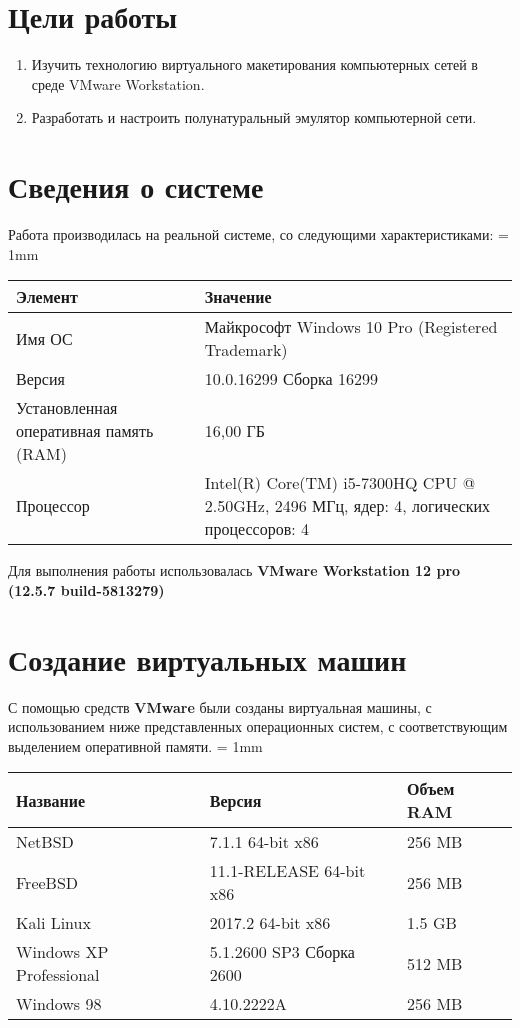 \documentclass[a4paper, 12pt]{article}		%
\begin{document}


%
\section{Цели работы}
\begin{enumerate}
\item Изучить технологию виртуального макетирования компьютерных сетей в среде VMware Workstation.
\item Разработать и настроить полунатуральный эмулятор компьютерной сети.
\end{enumerate}

\section{Сведения о системе}
Работа производилась на реальной системе, со следующими характеристиками:
\tabulinesep = 1mm
\begin{longtabu} to \textwidth {|X[10, c , m ] |X[25, c , m ] | }\firsthline\hline

\textbf{Элемент}&\textbf{Значение}\\ \hline \endfirsthead
	
Имя ОС&Майкрософт Windows 10 Pro (Registered Trademark)\\ \hline
Версия&10.0.16299 Сборка 16299\\ \hline
Установленная оперативная память (RAM) &16,00 ГБ\\ \hline
Процессор&Intel(R) Core(TM) i5-7300HQ CPU @ 2.50GHz, 2496 МГц, ядер: 4, логических процессоров: 4\\ \hline
\end{longtabu}
Для выполнения работы использовалась \textbf{VMware Workstation 12 pro (12.5.7 build-5813279)}

\section{Создание виртуальных машин}
С помощью средств \textbf{VMware} были созданы виртуальная машины, с использованием ниже представленных операционных систем, с соответствующим выделением оперативной памяти.
\tabulinesep = 1mm
\begin{longtabu} to \textwidth {|X[ c , m ] |X[2, c , m ] | X[ c , m ]|}\firsthline\hline
\textbf{Название}&\textbf{Версия}&\textbf{Объем RAM}\\ \hline \endfirsthead
NetBSD&7.1.1 64-bit x86&256 MB\\ \hline
FreeBSD&11.1-RELEASE 64-bit x86&256 MB\\ \hline
Kali Linux&2017.2 64-bit x86&1.5 GB\\ \hline
Windows XP Professional&5.1.2600 SP3 Сборка 2600&512 MB\\ \hline
Windows 98&4.10.2222A&256 MB\\ \hline
\end{longtabu}
\end{document}
